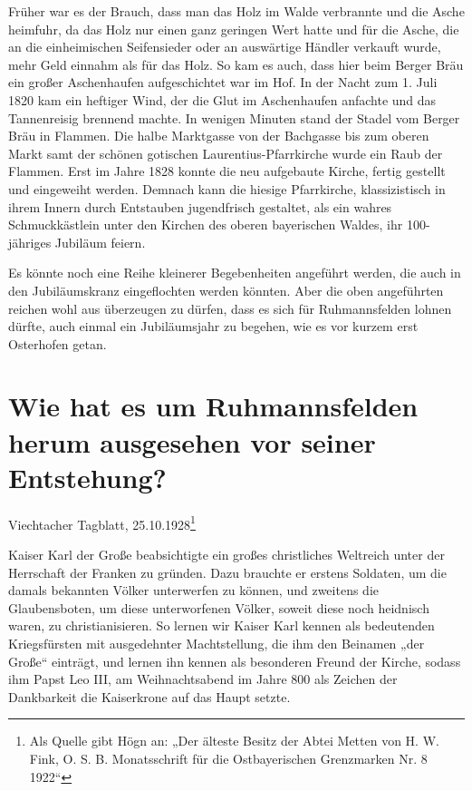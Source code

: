 \documentclass[12pt,a4paper]{book}
\begin{document}
Früher war es der Brauch, dass man das Holz im Walde verbrannte und die Asche
heimfuhr, da das Holz nur einen ganz geringen Wert hatte und für die Asche, die
an die einheimischen Seifensieder oder an auswärtige Händler verkauft wurde,
mehr Geld einnahm als für das Holz. So kam es auch, dass hier beim Berger Bräu
ein großer Aschenhaufen aufgeschichtet war im Hof. In der Nacht zum 1. Juli 1820
kam ein heftiger Wind, der die Glut im Aschenhaufen anfachte und das
Tannenreisig brennend machte. In wenigen Minuten stand der Stadel vom Berger
Bräu in Flammen. Die halbe Marktgasse von der Bachgasse bis zum oberen Markt
samt der schönen gotischen Laurentius-Pfarrkirche wurde ein Raub der Flammen.
Erst im Jahre 1828 konnte die neu aufgebaute Kirche, fertig gestellt und
eingeweiht werden. Demnach kann die hiesige Pfarrkirche, klassizistisch in ihrem
Innern durch Entstauben jugendfrisch gestaltet, als ein wahres Schmuckkästlein
unter den Kirchen des oberen bayerischen Waldes, ihr 100-jähriges Jubiläum
feiern.

Es könnte noch eine Reihe kleinerer Begebenheiten angeführt werden, die auch in
den Jubiläumskranz eingeflochten werden könnten. Aber die oben angeführten
reichen wohl aus überzeugen zu dürfen, dass es sich für Ruhmannsfelden lohnen
dürfte, auch einmal ein Jubiläumsjahr zu begehen, wie es vor kurzem erst
Osterhofen getan.

\chapter[Ruhmannsfelden vor seiner Entstehung]{Wie hat es um Ruhmannsfelden herum
ausgesehen vor seiner Entstehung?}

Viechtacher Tagblatt, 25.10.1928\footnote{Als Quelle gibt Högn an: „Der älteste
Besitz der Abtei Metten von H. W. Fink, O. S. B. Monatsschrift für die
Ostbayerischen Grenzmarken Nr. 8 1922“}

Kaiser Karl der Große beabsichtigte ein großes christliches Weltreich unter der
Herrschaft der Franken zu gründen. Dazu brauchte er erstens Soldaten, um die
damals bekannten Völker unterwerfen zu können, und zweitens die Glaubensboten,
um diese unterworfenen Völker, soweit diese noch heidnisch waren, zu
christianisieren. So lernen wir Kaiser Karl kennen als bedeutenden Kriegsfürsten
mit ausgedehnter Machtstellung, die ihm den Beinamen „der Große“ einträgt, und
lernen ihn kennen als besonderen Freund der Kirche, sodass ihm Papst Leo III, am
Weihnachtsabend im Jahre 800 als Zeichen der Dankbarkeit die Kaiserkrone auf das
Haupt setzte.
\end{document}
